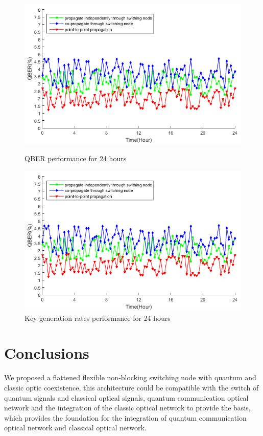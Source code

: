 \documentclass[letterpaper,10pt]{article}
\begin{document}
\begin{figure}[!htb]
   \begin{minipage}{0.48\textwidth}
     \centering
     \includegraphics[width=.9\linewidth]{qber_experiment}
     \caption{QBER performance for 24 hours} \label{Fig:comparison_of_loss}
   \end{minipage}\hfill
   \begin{minipage}{0.48\textwidth}
     \centering
     \includegraphics[width=.9\linewidth]{qber_experiment}
     \caption{Key generation rates performance for 24 hours} \label{Fig:comparison_of_rate}
   \end{minipage}
\end{figure}

\section{Conclusions}
We proposed a flattened flexible non-blocking switching node with quantum and classic optic coexistence, this architecture could be compatible with the switch of quantum signals and classical optical signals,  quantum communication optical network and the integration of the classic optical network to provide the basis, which provides the foundation for the integration of quantum communication optical network and classical optical network.
\end{document}
